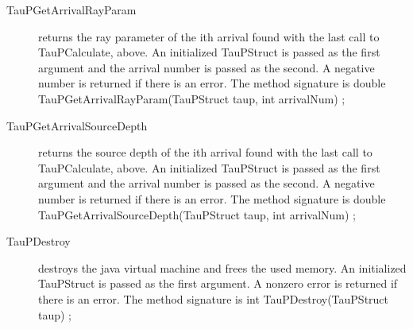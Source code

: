 \begin{center}
\begin{description}
\item[TauPGetArrivalRayParam] returns the ray parameter of the ith arrival
found with the last call to TauPCalculate, above.
An initialized TauPStruct is passed as the first argument and
the arrival number is passed as the second.
A negative number is returned if there is an error.
The method signature is\newline
double TauPGetArrivalRayParam(TauPStruct taup, int arrivalNum) {};

\item[TauPGetArrivalSourceDepth] returns the source depth of the ith arrival
found with the last call to TauPCalculate, above.
An initialized TauPStruct is passed as the first argument and
the arrival number is passed as the second.
A negative number is returned if there is an error.
The method signature is\newline
double TauPGetArrivalSourceDepth(TauPStruct taup, int arrivalNum) {};

\item[TauPDestroy] destroys the java virtual machine and frees the used memory.
An initialized TauPStruct is passed as the first argument. A nonzero
error is returned if there is an error.
The method signature is\newline
int TauPDestroy(TauPStruct taup) {};

\end{description}
\end{center}
